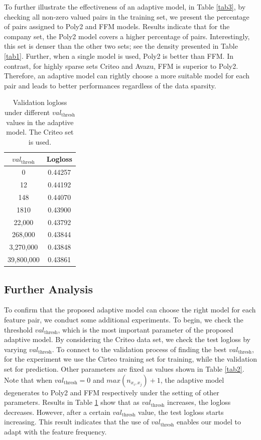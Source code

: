 To further illustrate the effectiveness of an adaptive model, in Table \ref{tab3}, by checking all non-zero valued pairs in the training set, we present the percentage of pairs assigned to Poly2 and FFM models. Results indicate that for the company set, the Poly2 model covers a higher percentage of pairs. Interestingly, this set is denser than the other two sets; see the density presented in Table \ref{tab1}. Further, when a single model is used, Poly2 is better than FFM. In contrast, for highly sparse sets Criteo and Avazu, FFM is superior to Poly2. Therefore, an adaptive model can rightly choose a more suitable model for each pair and leads to better performances regardless of the data sparsity.

\begin{table}
	\caption{Validation logloss under different $val_{\text{thresh}}$ values in the adaptive model. The Criteo set is used.}
	\label{tab4}
	\centering
	\begin{tabular}{|c|c|}
		\hline
		$val_{\text{thresh}}$&Logloss \\
		\hline
		0&0.44257 \\
		\hline
		12&0.44192 \\
		\hline
		148&0.44070 \\
		\hline
		1810&0.43900\\
		\hline
		22,000&0.43792 \\
		\hline
		268,000&0.43844\\
		\hline
		3,270,000&0.43848 \\
		\hline
		39,800,000&0.43861\\
		\hline
	\end{tabular}
\end{table}

\subsection{Further Analysis}

To confirm that the proposed adaptive model can choose the right model for each feature pair, we conduct some additional experiments. To begin, we check the threshold $val_{\text{thresh}}$, which is the most important parameter of the proposed adaptive model. By considering the Criteo data set, we check the test logloss by varying $val_{\text{thresh}}$. To connect to the validation process of finding the best $val_{\text{thresh}}$, for the experiment we use the Cirteo training set for training, while the validation set for prediction. Other parameters are fixed as values shown in Table \ref{tab2}. Note that when $val_{\text{thresh}} = 0$ and $max(n_{x_i,x_j})+1$, the adaptive model degenerates to Poly2 and FFM respectively under the setting of other parameters. Results in Table \ref{tab4} show that as $val_{\text{thresh}}$ increases, the logloss decreases. However, after a certain $val_{\text{thresh}}$ value, the test logloss starts increasing. This result indicates that the use of $val_{\text{thresh}}$ enables our model to adapt with the feature frequency.

